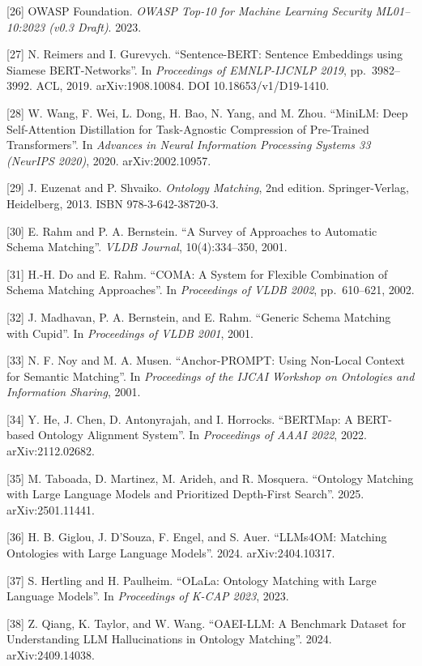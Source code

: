 \documentclass[
]{article}
\begin{document}
{[}26{]} OWASP Foundation. \emph{OWASP Top-10 for Machine Learning
Security ML01--10:2023 (v0.3 Draft)}. 2023.

{[}27{]} N. Reimers and I. Gurevych. ``Sentence-BERT: Sentence
Embeddings using Siamese BERT-Networks''. In \emph{Proceedings of
EMNLP-IJCNLP 2019}, pp.~3982--3992. ACL, 2019. arXiv:1908.10084. DOI
10.18653/v1/D19-1410.

{[}28{]} W. Wang, F. Wei, L. Dong, H. Bao, N. Yang, and M. Zhou.
``MiniLM: Deep Self-Attention Distillation for Task-Agnostic Compression
of Pre-Trained Transformers''. In \emph{Advances in Neural Information
Processing Systems 33 (NeurIPS 2020)}, 2020. arXiv:2002.10957.

{[}29{]} J. Euzenat and P. Shvaiko. \emph{Ontology Matching}, 2nd
edition. Springer-Verlag, Heidelberg, 2013. ISBN 978-3-642-38720-3.

{[}30{]} E. Rahm and P. A. Bernstein. ``A Survey of Approaches to
Automatic Schema Matching''. \emph{VLDB Journal}, 10(4):334--350, 2001.

{[}31{]} H.-H. Do and E. Rahm. ``COMA: A System for Flexible Combination
of Schema Matching Approaches''. In \emph{Proceedings of VLDB 2002},
pp.~610--621, 2002.

{[}32{]} J. Madhavan, P. A. Bernstein, and E. Rahm. ``Generic Schema
Matching with Cupid''. In \emph{Proceedings of VLDB 2001}, 2001.

{[}33{]} N. F. Noy and M. A. Musen. ``Anchor-PROMPT: Using Non-Local
Context for Semantic Matching''. In \emph{Proceedings of the IJCAI
Workshop on Ontologies and Information Sharing}, 2001.

{[}34{]} Y. He, J. Chen, D. Antonyrajah, and I. Horrocks. ``BERTMap: A
BERT-based Ontology Alignment System''. In \emph{Proceedings of AAAI
2022}, 2022. arXiv:2112.02682.

{[}35{]} M. Taboada, D. Martinez, M. Arideh, and R. Mosquera. ``Ontology
Matching with Large Language Models and Prioritized Depth-First
Search''. 2025. arXiv:2501.11441.

{[}36{]} H. B. Giglou, J. D'Souza, F. Engel, and S. Auer. ``LLMs4OM:
Matching Ontologies with Large Language Models''. 2024.
arXiv:2404.10317.

{[}37{]} S. Hertling and H. Paulheim. ``OLaLa: Ontology Matching with
Large Language Models''. In \emph{Proceedings of K-CAP 2023}, 2023.

{[}38{]} Z. Qiang, K. Taylor, and W. Wang. ``OAEI-LLM: A Benchmark
Dataset for Understanding LLM Hallucinations in Ontology Matching''.
2024. arXiv:2409.14038.
\end{document}
